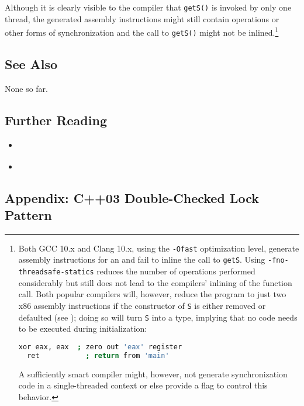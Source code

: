 \noindent Although it is clearly visible to the compiler that \lstinline!getS()! is
invoked by only one thread, the generated assembly instructions might
still contain  operations or other forms of
synchronization and the call to \lstinline!getS()! might not be 
inlined.{\cprotect\footnote{Both GCC 10.x and Clang 10.x, using the
\lstinline!-Ofast! optimization level, generate assembly instructions for
an  and fail to inline the call
to \lstinline!getS!. Using \lstinline!-fno-threadsafe-statics! reduces the
number of operations performed considerably but still does not lead to
the compilers' inlining of the function call. Both popular compilers
will, however, reduce the program to just two x86 assembly
instructions if the  constructor of \lstinline!S!
  is either removed or defaulted (see );
  doing so will turn \lstinline!S! into a 
  type, implying that no code needs to be executed during
  initialization:

  \begin{lstlisting}[language=bash,style=footcodeplain]
  xor eax, eax  ; zero out 'eax' register
  ret           ; return from 'main'
  \end{lstlisting}

\noindent A sufficiently smart compiler might, however, not generate
  synchronization code in a single-threaded context or else provide a
  flag to control this behavior.
  }}

\subsection[See Also]{See Also}\label{see-also}

None so far.

\subsection[Further Reading]{Further Reading}\label{further-reading}

\begin{itemize}
\item{\cite{meyers04}}
\item{\cite{stroustrup20}}
\end{itemize}

\subsection[Appendix: C++03 Double-Checked Lock Pattern]{Appendix: C++03 Double-Checked Lock Pattern}\label{appendix:-c++03-double-checked-lock-pattern}

